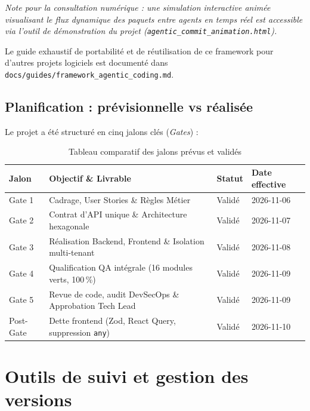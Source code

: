 \begin{center}
  \small
  \textit{Note pour la consultation numérique : une simulation interactive animée visualisant le flux dynamique des paquets entre agents en temps réel est accessible via l'outil de démonstration du projet (\nolinkurl{agentic_commit_animation.html}).}
\end{center}

Le guide exhaustif de portabilité et de réutilisation de ce framework pour d'autres projets logiciels est documenté dans \nolinkurl{docs/guides/framework_agentic_coding.md}.

\subsection{Planification : prévisionnelle vs réalisée}

Le projet a été structuré en cinq jalons clés (\emph{Gates}) :
\begin{table}[h]
\centering
\small
\begin{tabular}{lp{6cm}ll}
\toprule
\textbf{Jalon} & \textbf{Objectif \& Livrable} & \textbf{Statut} & \textbf{Date effective} \\
\midrule
Gate 1 & Cadrage, User Stories \& Règles Métier & Validé & 2026-11-06 \\
Gate 2 & Contrat d'API unique \& Architecture hexagonale & Validé & 2026-11-07 \\
Gate 3 & Réalisation Backend, Frontend \& Isolation multi-tenant & Validé & 2026-11-08 \\
Gate 4 & Qualification QA intégrale (16 modules verts, 100\,\%) & Validé & 2026-11-09 \\
Gate 5 & Revue de code, audit DevSecOps \& Approbation Tech Lead & Validé & 2026-11-09 \\
Post-Gate & Dette frontend (Zod, React Query, suppression \texttt{any}) & Validé & 2026-11-10 \\
\bottomrule
\end{tabular}
\caption{Tableau comparatif des jalons prévus et validés}
\label{tab:jalons-projet}
\end{table}

\section{Outils de suivi et gestion des versions}

